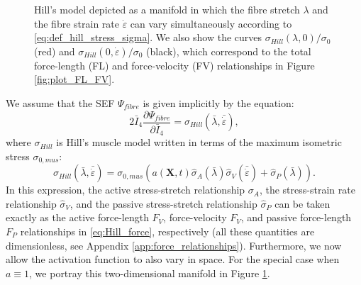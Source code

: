 \documentclass{sfuthesis}
\numberwithin{equation}{section}
\numberwithin{figure}{chapter}
\numberwithin{table}{chapter}
\theoremstyle{definition}
\def\*#1{{\mathbf{#1}}} %
\newcommand{\pder}[2]{\dfrac{\partial #1}{\partial #2}}
\newcommand{\depsilon}{\dot{\varepsilon}}
\newcommand{\I}{{\bar{I}}}
\begin{document}
\begin{figure}
    \centering
    \caption{Hill's model depicted as a manifold in which the fibre stretch $\lambda$ and the fibre strain rate $\depsilon$ can vary simultaneously according to \eqref{eq:def_hill_stress_sigma}. We also show the curves $\sigma_{Hill}(\lambda,0)/\sigma_0$ (red) and $\sigma_{Hill}(0,\depsilon)/\sigma_0$ (black), which correspond to the total force-length (FL) and force-velocity (FV) relationships in Figure \ref{fig:plot_FL_FV}. \label{fig:plot_FLV}}
\end{figure}

{\color{red}We assume that the SEF $\Psi_{fibre}$ is given implicitly by the equation:}
\begin{equation} \label{eq:ode_fibre_sef}
    2 \I_4 \pder{\Psi_{fibre}}{\I_4} = \sigma_{Hill}(\bar{\lambda}, \bar{\depsilon}),
\end{equation}
where $\sigma_{Hill}$ is Hill's muscle model written in terms of the maximum isometric stress $\sigma_{0,mus}$:
\begin{equation} \label{eq:def_hill_stress_sigma}
    \sigma_{Hill}(\bar{\lambda}, \bar{\depsilon}) = \sigma_{0,mus} \left( a(\*X,t) \widehat{\sigma}_A(\bar{\lambda}) \widehat{\sigma}_V(\bar{\depsilon}) + \widehat{\sigma}_P(\bar{\lambda}) \right).
\end{equation}
{\color{blue}In this expression, the active stress-stretch relationship $\sigma_A$, the stress-strain rate relationship $\widehat{\sigma}_V$, and the passive stress-stretch relationship $\widehat{\sigma}_P$ can be taken exactly as the active force-length $F_V$, force-velocity $F_V$, and passive force-length $F_P$ relationships in \eqref{eq:Hill_force}, respectively (all these quantities are dimensionless, see Appendix \ref{app:force_relationships}). Furthermore, we now allow the activation function to also vary in space. For the special case when $a \equiv 1$, we portray this two-dimensional manifold in Figure \ref{fig:plot_FLV}.}
\end{document}
